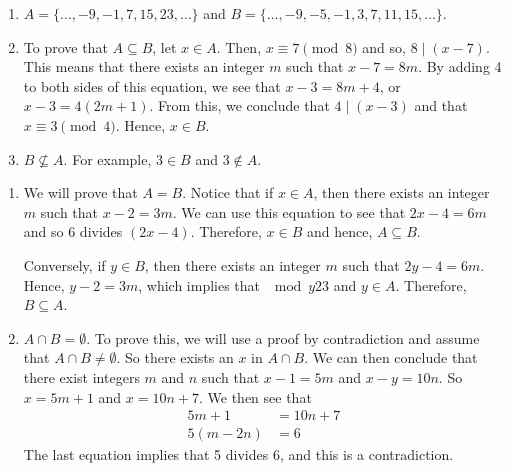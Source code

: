 \begin{list}{\bf{\ref{exer:modsubset}.}}
\item \begin{enumerate}
  \item $A = \{ \ldots, -9, -1, 7, 15, 23, \ldots \}$ and $B = \{ \ldots, -9, -5, -1, 3, 7, 11, 15, \ldots \}$.
  \item To prove that $A \subseteq B$, let $x \in A$.  Then, $x \equiv 7 \pmod 8$ and so, 
$8 \mid \left( x - 7 \right)$.  This means that there exists an integer $m$ such that $x - 7 = 8m$.  
By adding 4 to both sides of this equation, we see that $x - 3 = 8m + 4$, or 
$x - 3 = 4 \left( 2m + 1 \right)$.  From this, we conclude that $4 \mid \left( x - 3 \right)$ and that $x \equiv 3 \pmod 4$.  Hence, $x \in B$.
\item $B \not \subseteq A$.  For example, $3 \in B$ and $3 \notin A$.
\end{enumerate}
\end{list}

\begin{list}{\bf{\ref{exer51:modsets}.}}
\item \begin{enumerate}
\item We will prove that $A = B$.  Notice that if $x \in A$, then there exists an integer $m$ such that $x - 2 = 3m$.  We can use this equation to see that $2x - 4 = 6m$ and so 6 divides $(2x - 4)$.  Therefore, $x \in B$ and hence, $A \subseteq B$.

Conversely, if $y \in B$, then there exists an integer $m$ such that $2y - 4 = 6m$.  Hence, $y - 2 = 3m$, which implies that $\mod{y}{2}{3}$ and $y \in A$.  Therefore, $B \subseteq A$.

\addtocounter{enumi}{1}
\item $A \cap B = \emptyset$.  To prove this, we will use a proof by contradiction and assume that $A \cap B \ne \emptyset$.  So there exists an $x$ in $A \cap B$.  We can then conclude that there exist integers $m$ and $n$ such that $x - 1 = 5m$ and $x - y = 10n$.  So $x = 5m + 1$ and $x = 10n + 7$.  We then see that
\begin{align*}
5m + 1 &= 10n + 7 \\
5(m - 2n) &= 6
\end{align*}
The last equation implies that 5 divides 6, and this is a contradiction.
\end{enumerate}
\end{list}



